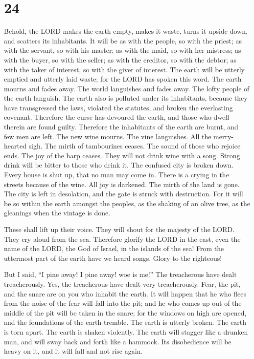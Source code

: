 \hypertarget{section-23}{%
\section{24}\label{section-23}}

 Behold, the LORD makes the earth empty, makes it waste,
turns it upside down, and scatters its inhabitants.  It will
be as with the people, so with the priest; as with the servant, so with
his master; as with the maid, so with her mistress; as with the buyer,
so with the seller; as with the creditor, so with the debtor; as with
the taker of interest, so with the giver of interest.  The
earth will be utterly emptied and utterly laid waste; for the LORD has
spoken this word.  The earth mourns and fades away. The
world languishes and fades away. The lofty people of the earth languish.
 The earth also is polluted under its inhabitants, because
they have transgressed the laws, violated the statutes, and broken the
everlasting covenant.  Therefore the curse has devoured the
earth, and those who dwell therein are found guilty. Therefore the
inhabitants of the earth are burnt, and few men are left. 
The new wine mourns. The vine languishes. All the merry-hearted sigh.
 The mirth of tambourines ceases. The sound of those who
rejoice ends. The joy of the harp ceases.  They will not
drink wine with a song. Strong drink will be bitter to those who drink
it.  The confused city is broken down. Every house is shut
up, that no man may come in.  There is a crying in the
streets because of the wine. All joy is darkened. The mirth of the land
is gone.  The city is left in desolation, and the gate is
struck with destruction.  For it will be so within the
earth amongst the peoples, as the shaking of an olive tree, as the
gleanings when the vintage is done.

 These shall lift up their voice. They will shout for the
majesty of the LORD. They cry aloud from the sea. 
Therefore glorify the LORD in the east, even the name of the LORD, the
God of Israel, in the islands of the sea!  From the
uttermost part of the earth have we heard songs. Glory to the righteous!

But I said, ``I pine away! I pine away! woe is me!'' The treacherous
have dealt treacherously. Yes, the treacherous have dealt very
treacherously.  Fear, the pit, and the snare are on you who
inhabit the earth.  It will happen that he who flees from
the noise of the fear will fall into the pit; and he who comes up out of
the middle of the pit will be taken in the snare; for the windows on
high are opened, and the foundations of the earth tremble. 
The earth is utterly broken. The earth is torn apart. The earth is
shaken violently.  The earth will stagger like a drunken
man, and will sway back and forth like a hammock. Its disobedience will
be heavy on it, and it will fall and not rise again.

